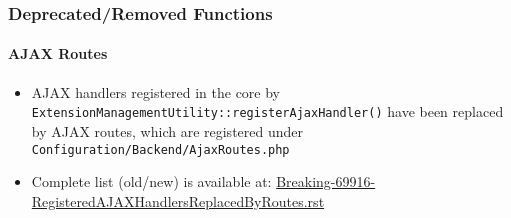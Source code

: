 %

\begin{frame}[fragile]
	\frametitle{Deprecated/Removed Functions}
	\framesubtitle{AJAX Routes}

	\begin{itemize}

		\item AJAX handlers registered in the core by
			\texttt{ExtensionManagementUtility::registerAjaxHandler()}
			have been replaced by AJAX routes, which are registered under
			\texttt{ Configuration/Backend/AjaxRoutes.php}

		\item Complete list (old/new) is available at:\newline
				\href{https://forge.typo3.org/projects/typo3cms-core/repository/revisions/3f0fb6229ba391356e5ed4984eb1c9418ba6663e/entry/typo3/sysext/core/Documentation/Changelog/master/Breaking-69916-RegisteredAJAXHandlersReplacedByRoutes.rst}{Breaking-69916-RegisteredAJAXHandlersReplacedByRoutes.rst}
	\end{itemize}

\end{frame}


